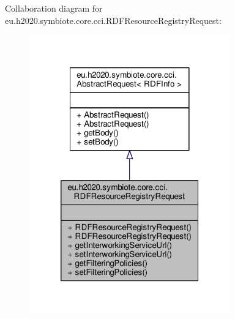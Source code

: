 Collaboration diagram for eu.\+h2020.\+symbiote.\+core.\+cci.\+R\+D\+F\+Resource\+Registry\+Request\+:
\nopagebreak
\begin{figure}[H]
\begin{center}
\leavevmode
\includegraphics[width=246pt]{classeu_1_1h2020_1_1symbiote_1_1core_1_1cci_1_1RDFResourceRegistryRequest__coll__graph}
\end{center}
\end{figure}
